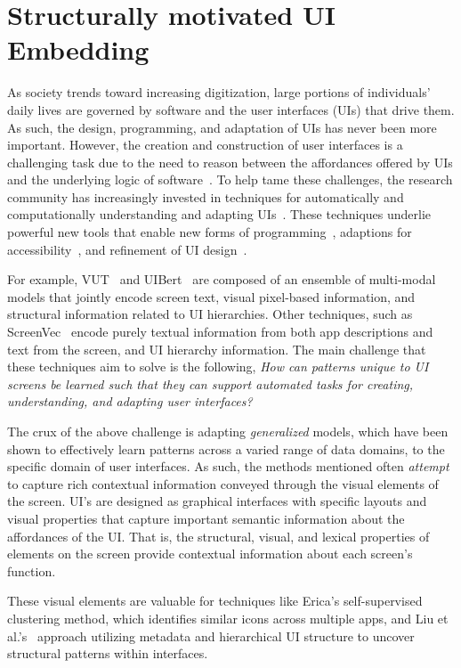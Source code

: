\section{Structurally motivated UI Embedding}
\label{sec:FRAME}

As society trends toward increasing digitization, large portions of individuals' daily lives are governed by software and the user interfaces (UIs) that drive them. As such, the design, programming, and adaptation of UIs has never been more important. However, the creation and construction of user interfaces is a challenging task due to the need to reason between the affordances offered by UIs and the underlying logic of software~\cite{Myers:CHD94}. To help tame these challenges, the research community has increasingly invested in techniques for automatically and computationally understanding and adapting UIs~\cite{li2021vut,bai2021uibert,Li21}. These techniques underlie powerful new tools that enable new forms of programming~\cite{DBLP:journals/corr/abs-1802-02312}, adaptions for accessibility~\cite{9284063}, and refinement of UI design~\cite{mansur2023aidui}.

For example, VUT~\cite{li2021vut} and UIBert~\cite{bai2021uibert} are composed of an ensemble of multi-modal models that jointly encode screen text, visual pixel-based information, and structural information related to UI hierarchies. Other techniques, such as ScreenVec~\cite{Li21} encode purely textual information from both app descriptions and text from the screen, and UI hierarchy information. The main challenge that these techniques aim to solve is the following, \textit{How can patterns unique to UI screens be learned such that they can support automated tasks for creating, understanding, and adapting user interfaces?}

The crux of the above challenge is adapting \textit{generalized} models, which have been shown to effectively learn patterns across a varied range of data domains, to the specific domain of user interfaces. As such, the methods mentioned often \textit{attempt} to capture rich contextual information conveyed through the visual elements of the screen. UI's are designed as graphical interfaces with specific layouts and visual properties that capture important semantic information about the affordances of the UI. That is, the structural, visual, and lexical properties of elements on the screen provide contextual information about each screen's function. 

These visual elements are valuable for techniques like Erica's \cite{Deka16} self-supervised clustering method, which identifies similar icons across multiple apps, and Liu et al.'s~\cite{Liu18} approach utilizing metadata and hierarchical UI structure to uncover structural patterns within interfaces. 

